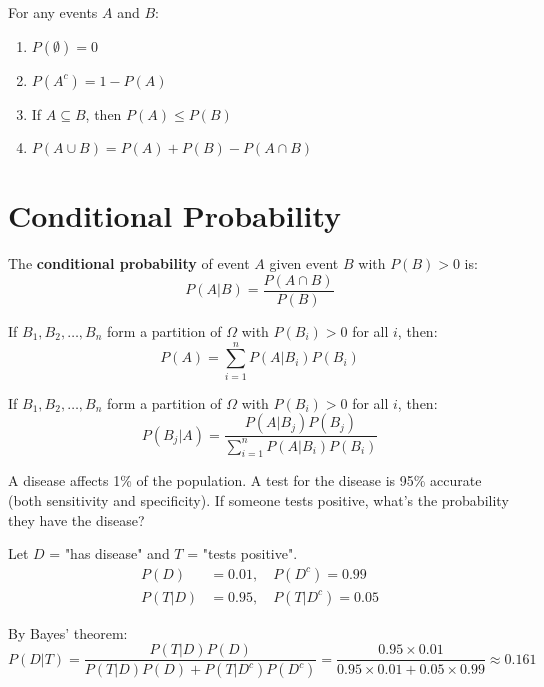 \begin{theorem}
For any events $A$ and $B$:
\begin{enumerate}
    \item $P(\emptyset) = 0$
    \item $P(A^c) = 1 - P(A)$
    \item If $A \subseteq B$, then $P(A) \leq P(B)$
    \item $P(A \cup B) = P(A) + P(B) - P(A \cap B)$
\end{enumerate}
\end{theorem}

\section{Conditional Probability}

\begin{definition}
The \textbf{conditional probability} of event $A$ given event $B$ with $P(B) > 0$ is:
\[P(A|B) = \frac{P(A \cap B)}{P(B)}\]
\end{definition}

\begin{theorem}
If $B_1, B_2, \ldots, B_n$ form a partition of $\Omega$ with $P(B_i) > 0$ for all $i$, then:
\[P(A) = \sum_{i=1}^{n} P(A|B_i)P(B_i)\]
\end{theorem}

\begin{theorem}
If $B_1, B_2, \ldots, B_n$ form a partition of $\Omega$ with $P(B_i) > 0$ for all $i$, then:
\[P(B_j|A) = \frac{P(A|B_j)P(B_j)}{\sum_{i=1}^{n} P(A|B_i)P(B_i)}\]
\end{theorem}

\begin{example}
A disease affects 1\% of the population. A test for the disease is 95\% accurate (both sensitivity and specificity). If someone tests positive, what's the probability they have the disease?

Let $D$ = "has disease" and $T$ = "tests positive".
\begin{align}
P(D) &= 0.01, \quad P(D^c) = 0.99 \\
P(T|D) &= 0.95, \quad P(T|D^c) = 0.05
\end{align}

By Bayes' theorem:
\[P(D|T) = \frac{P(T|D)P(D)}{P(T|D)P(D) + P(T|D^c)P(D^c)} = \frac{0.95 \times 0.01}{0.95 \times 0.01 + 0.05 \times 0.99} \approx 0.161\]
\end{example}

